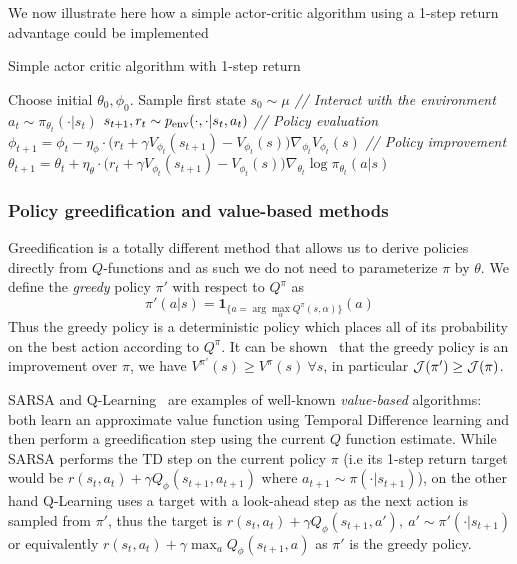 We now illustrate here how a simple actor-critic algorithm using a 1-step return advantage could be implemented

\begin{center}
\begin{minipage}{0.9\textwidth}
\begin{algorithm}[H]
\caption{Simple actor critic algorithm with 1-step return}
\label{alg:ac_methods}
\begin{algorithmic}[1]
\STATE Choose initial $\theta_0, \phi_0$.
\STATE Sample first state $s_0 \sim \mu$
\STATE \textit{// Interact with the environment}
\STATE $a_t \sim \pi_{\theta_t}(\cdot | s_t)$
\STATE $s_{t+1}, r_t \sim p_{\text{env}}(\cdot, \cdot | s_t, a_t)$
\STATE \textit{// Policy evaluation}
\STATE $\phi_{t+1} = \phi_t - \eta_\phi \cdot \big(r_t + \gamma V_{\phi_t}(s_{t+1}) - V_{\phi_t}(s)\big) \nabla_{\phi_t}V_{\phi_t}(s) $
\STATE \textit{// Policy improvement}
\STATE $\theta_{t+1} = \theta_t + \eta_\theta \cdot \big( r_t + \gamma V_{\phi_t}(s_{t+1}) - V_{\phi_t}(s)\big) \nabla_{\theta_t} \log \pi_{\theta_t}(a|s)$ 
\ENDFOR
\end{algorithmic}
\end{algorithm}
\end{minipage}
\end{center}
\vspace{1em}


\subsubsection{Policy greedification and value-based methods}
\label{subsec:qlearning}
Greedification is a totally different method that allows us to derive policies directly from $Q$-functions and as such we do not need to parameterize $\pi$ by $\theta$.
We define the \emph{greedy} policy $\pi'$ with respect to $Q^\pi$ as
\begin{equation}
\label{eq:greedification}
    \pi'(a|s) = \mathbf{1}_{\{a=\arg \max_\alpha Q^\pi(s,\alpha)\} }(a)
\end{equation}
Thus the greedy policy is a deterministic policy which places all of its probability on the best action according to $Q^\pi$. It can be shown~\citep{sutton18book} that the greedy policy is an improvement over $\pi$, we have $V^{\pi'}(s) \ge V^\pi(s)\ \forall s$, in particular ${\mathcal{J}}(\pi') \ge {\mathcal{J}}(\pi)$.

SARSA and Q-Learning~\citep{watkins1992q} are examples of well-known \emph{value-based} algorithms: both learn an approximate value function using Temporal Difference learning and then perform a greedification step using the current $Q$ function estimate. While SARSA performs the TD step on the current policy $\pi$ (i.e its 1-step return target would be $r(s_t, a_t) + \gamma Q_\phi(s_{t+1}, a_{t+1})$ where $a_{t+1} \sim \pi(\cdot|s_{t+1})$), on the other hand Q-Learning uses a target with a look-ahead step as the next action is sampled from $\pi'$, thus the target is  $r(s_{t}, a_t) + \gamma Q_\phi(s_{t+1}, a'), \ a' \sim \pi'(\cdot|s_{t+1})$ or equivalently $r(s_t, a_t) + \gamma \max_a Q_\phi(s_{t+1}, a)$ as $\pi'$ is the greedy policy.



